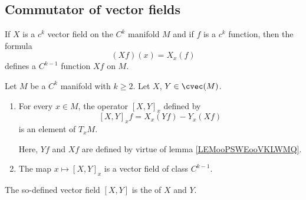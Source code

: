 \subsection{Commutator of vector fields}

\begin{lemma}       \label{LEMooPSWEooVKLWMQ}
	If \( X\) is a \( c^k\) vector field on the \( C^k\) manifold \( M\) and if \( f\) is a \( c^k\) function, then the formula
	\begin{equation}
		(Xf)(x)=X_x(f)
	\end{equation}
	defines a \( C^{k-1}\) function \( Xf\) on \( M\).
\end{lemma}

\begin{propositionDef}      \label{DEFooHOTOooRaPwyo}
	Let \( M\) be a \( C^k\) manifold with \( k\geq 2\). Let $X$, $Y\in\cvec(M)$.
	\begin{enumerate}
		\item       \label{ITEMooZKKUooQjYftU}
		      For every \( x\in M\), the operator \( [X,Y]_x\) defined by
		      \begin{equation}        \label{EQooDSKWooXdjPPP}
			      [X,Y]_xf=X_x(Yf)-Y_x(Xf)
		      \end{equation}
		      is an element of \( T_xM\).

		      Here, \( Yf\) and \( Xf\) are defined by virtue of lemma \ref{LEMooPSWEooVKLWMQ}.
		\item       \label{ITEMooPGPLooQrKxWY}
		      The map \( x\mapsto [X,Y]_x\) is a vector field of class \( C^{k-1}\).
	\end{enumerate}

	The so-defined vector field \( [X,Y]\) is the  of \( X\) and \( Y\).
\end{propositionDef}


